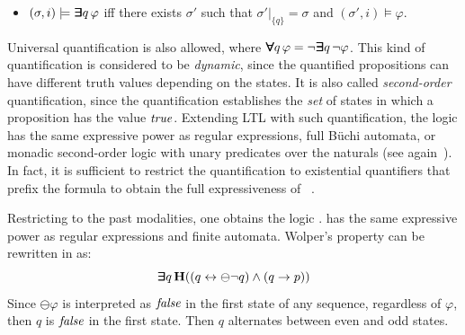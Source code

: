 \begin{itemize}
\item $( \sigma, i ) \models \boldsymbol{\bm{\exists}\kern-0.6em\bm{\exists}} q \, \varphi$ iff there exists
$\sigma'$ such that $\sigma' |_{\{ q \} } = \sigma$ and 
$( \sigma', i) \models \varphi$.
\end{itemize}
%
%
Universal quantification is also allowed, where $\bm{\forall}\kern-0.6em\bm{\forall} q\, \varphi =
\neg \bm{\exists}\kern-0.6em\bm{\exists} q\, \neg \varphi$.
This kind of quantification is considered to be {\em dynamic}, since the quantified propositions can have different truth values depending on the states. It is also called  {\em second-order} quantification, since the quantification establishes the {\em set} of states in which a proposition has the value $\mathit{true}$.
Extending LTL with such quantification, the logic \QLTL{} has the same expressive power as regular expressions, full B\"{u}chi
automata, or monadic second-order logic with unary predicates over the naturals (see again~\cite{Thomas}).
In fact, it is sufficient to restrict the quantification to existential quantifiers that prefix the formula to obtain the full expressiveness of \QLTL{}~\cite{Thomas}. 

Restricting \QLTL{} to the past modalities, one obtains the logic \QPLTL{}. \QPLTL{} has the same expressive
power as regular expressions and finite automata.
Wolper's property can
be rewritten in \QPLTL{} as:
\begin{equation} \label{form1} \bm{\exists}\kern-0.6em\bm{\exists} q \,
{\bf H} (( q \leftrightarrow \ominus \neg q )   \wedge (q \rightarrow p ) )\end{equation}
Since $\ominus \varphi $ is interpreted as  $\mathit{false}$ in the first state of any sequence, regardless of $\varphi$, then
$q$ is $\mathit{false}$ in the first state. Then $q$ alternates between even and odd states.



